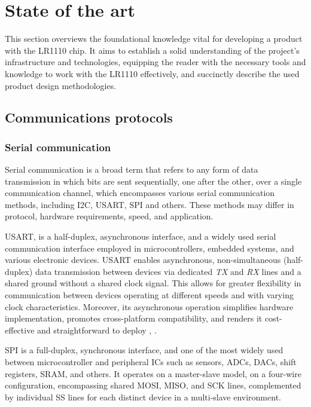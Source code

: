 \section{State of the art} \label{sec:knowledge}
This section overviews the foundational knowledge vital for developing a product with the LR1110 chip. It aims to establish a solid understanding of the project's infrastructure and technologies, equipping the reader with the necessary tools and knowledge to work with the LR1110 effectively, and succinctly describe the used product design methodologies. 

\subsection{Communications protocols}
\subsubsection{Serial communication}
Serial communication is a broad term that refers to any form of data transmission in which bits are sent sequentially, one after the other, over a single communication channel, which encompasses various serial communication methods, including \ac{I2C}, \ac{USART}, \ac{SPI} and others. These methods may differ in protocol, hardware requirements, speed, and application.

\ac{USART}, is a half-duplex, asynchronous interface, and a widely used serial communication interface employed in microcontrollers, embedded systems, and various electronic devices. \ac{USART} enables asynchronous, non-simultaneous (half-duplex) data transmission between devices via dedicated \textit{TX} and \textit{RX} lines and a shared ground without a shared clock signal. This allows for greater flexibility in communication between devices operating at different speeds and with varying clock characteristics. Moreover, its asynchronous operation simplifies hardware implementation, promotes cross-platform compatibility, and renders it cost-effective and straightforward to deploy \cite{UART1}, \cite{UART2}.

\ac{SPI} is a full-duplex, synchronous interface, and one of the most widely used between microcontroller and peripheral ICs such as sensors, ADCs, DACs, shift registers, SRAM, and others. It operates on a master-slave model, on a four-wire configuration, encompassing shared \ac{MOSI}, \ac{MISO}, and \ac{SCK} lines, complemented by individual \ac{SS} lines for each distinct device in a multi-slave environment.

